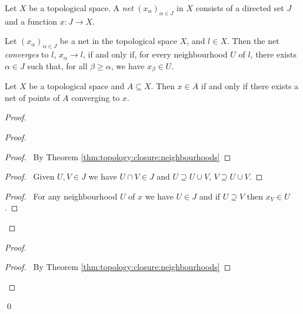     \begin{df}[Net]
  Let $X$ be a topological space. A \emph{net} $(x_\alpha)_{\alpha \in J}$ in
$X$ consists of a directed set $J$ and a function $x : J \rightarrow X$.
\end{df}

  \begin{df}[Convergence]
  Let $(x_\alpha)_{\alpha \in J}$ be a net in the topological space $X$, and
  $l \in X$. Then the net \emph{converges} to $l$, $x_\alpha \rightarrow l$,
if and only if, for every neighbourhood $U$ of $l$, there exists $\alpha \in J$
such that, for all $\beta \geq \alpha$, we have $x_\beta \in U$.
\end{df}

  \begin{thm}[AC]
    \label{thm:topology:convergence:closure}
  Let $X$ be a topological space and $A \subseteq X$. Then $x \in
\overline{A}$ if and only if there exists a net of points of $A$ converging to
$x$.
\end{thm}

\begin{proof}
 \pf
 \begin{proof}
   \begin{proof}
     \pf\ By Theorem \ref{thm:topology:closure:neighbourhoods}
   \end{proof}
   \begin{proof}
     \pf\ Given $U, V \in J$ we have $U \cap V \in J$ and $U \supseteq U \cup
V$, $V \supseteq U \cup V$.
   \end{proof}
   \begin{proof}
     \pf\ For any neighbourhood $U$ of $x$ we have $U \in J$ and if $U
\supseteq V$ then $x_V \in U$.
   \end{proof}
 \end{proof}
 \begin{proof}
   \qedstep
   \begin{proof}
     \pf\ By Theorem \ref{thm:topology:closure:neighbourhoods}
   \end{proof}
 \end{proof}
 \qed
\end{proof}

